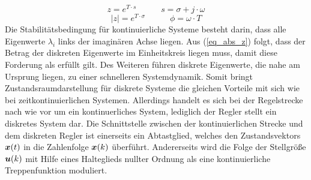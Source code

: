 \begin{equation}
z = e^{T\cdot s} \hspace{35pt} s = \sigma + j\cdot \omega
\end{equation}
\begin{equation}
\vert z \vert = e^{T\cdot \sigma} \hspace{35pt} \phi = \omega\cdot T
\label{eq_abs_z}
\end{equation}
Die Stabilitätsbedingung für kontinuierliche Systeme besteht darin, dass alle Eigenwerte $\lambda_i$ links der imaginären Achse liegen. Aus (\ref{eq_abs_z}) folgt, dass der Betrag der diskreten Eigenwerte im Einheitskreis liegen muss, damit diese Forderung als erfüllt gilt. Des Weiteren führen diskrete Eigenwerte, die nahe am Ursprung liegen, zu einer schnelleren Systemdynamik. Somit bringt Zustandsraumdarstellung für diskrete Systeme die gleichen Vorteile mit sich wie bei zeitkontinuierlichen Systemen.
Allerdings handelt es sich bei der Regelstrecke nach wie vor um ein kontinuerliches System, lediglich der Regler stellt ein diskretes System dar. Die Schnittstelle zwischen der kontinuierlichen Strecke und dem diskreten Regler ist einerseits ein Abtastglied, welches den Zustandsvektors $\boldsymbol{x}(t)$ in die Zahlenfolge $\boldsymbol{x}(k)$ überführt. Andererseits wird die Folge der Stellgröße $\boldsymbol{u}(k)$ mit Hilfe eines Halteglieds nullter Ordnung als eine kontinuierliche Treppenfunktion moduliert.

